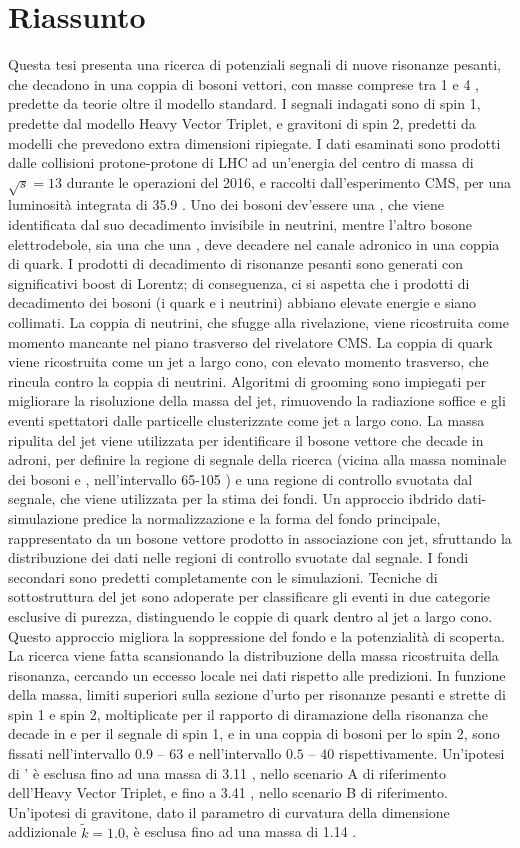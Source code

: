 \chapter*{Riassunto}
\label{ch:riassunto}

Questa tesi presenta una ricerca di potenziali segnali di nuove risonanze pesanti, che decadono in una coppia di bosoni vettori, con masse comprese tra 1 \TeV e 4 \TeV, predette da teorie oltre il modello standard. I segnali indagati sono \Wp di spin 1, predette dal modello Heavy Vector Triplet, e gravitoni di spin 2, predetti da modelli che prevedono extra dimensioni ripiegate. I dati esaminati sono prodotti dalle collisioni protone-protone di LHC ad un'energia del centro di massa di $\sqrt{s}=13$ \TeV durante le operazioni del 2016, e raccolti dall'esperimento CMS, per una luminosit\`a integrata di 35.9 \fbinv. Uno dei bosoni dev'essere una \Z, che viene identificata dal suo decadimento invisibile in neutrini, mentre l'altro bosone elettrodebole, sia una \W che una \Z, deve decadere nel canale adronico in una coppia di quark. I prodotti di decadimento di risonanze pesanti sono generati con significativi boost di Lorentz; di conseguenza, ci si aspetta che i prodotti di decadimento dei bosoni (i quark e i neutrini) abbiano elevate energie e siano collimati. La coppia di neutrini, che sfugge alla rivelazione, viene ricostruita come momento mancante nel piano trasverso del rivelatore CMS. La coppia di quark viene ricostruita come un jet a largo cono, con elevato momento trasverso, che rincula contro la coppia di neutrini. Algoritmi di grooming sono impiegati per migliorare la risoluzione della massa del jet, rimuovendo la radiazione soffice e gli eventi spettatori dalle particelle clusterizzate come jet a largo cono. La massa ripulita del jet viene utilizzata per identificare il bosone vettore che decade in adroni, per definire la regione di segnale della ricerca (vicina alla massa nominale dei bosoni \W e \Z, nell'intervallo 65-105 \GeV) e una regione di controllo svuotata dal segnale, che viene utilizzata per la stima dei fondi. Un approccio ibdrido dati-simulazione predice la normalizzazione e la forma del fondo principale, rappresentato da un bosone vettore prodotto in associazione con jet, sfruttando la distribuzione dei dati nelle regioni di controllo svuotate dal segnale. I fondi secondari sono predetti completamente con le simulazioni. Tecniche di sottostruttura del jet sono adoperate per classificare gli eventi in due categorie esclusive di purezza, distinguendo le coppie di quark dentro al jet a largo cono. Questo approccio migliora la soppressione del fondo e la potenzialit\`a di scoperta. La ricerca viene fatta scansionando la distribuzione della massa ricostruita della risonanza, cercando un eccesso locale nei dati rispetto alle predizioni. In funzione della massa, limiti superiori sulla sezione d'urto per risonanze pesanti e strette di spin 1 e spin 2, moltiplicate per il rapporto di diramazione della risonanza che decade in \Z e \W per il segnale di spin 1, e in una coppia di bosoni \Z per lo spin 2, sono fissati nell'intervallo $0.9$ -- $63$ \fb e nell'intervallo $0.5$ -- $40$ \fb rispettivamente. Un'ipotesi di \W' \`e esclusa fino ad una massa di 3.11 \TeV, nello scenario A di riferimento dell'Heavy Vector Triplet, e fino a 3.41 \TeV, nello scenario B di riferimento. Un'ipotesi di gravitone, dato il parametro di curvatura della dimensione addizionale $\tilde{k}=1.0$, \`e esclusa fino ad una massa di 1.14 \TeV.

\clearpage

